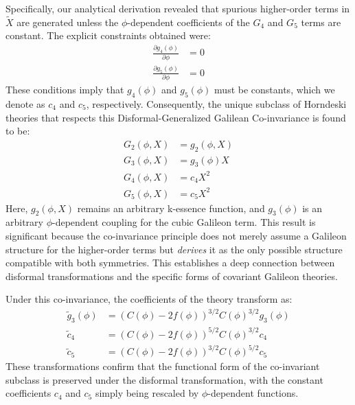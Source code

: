 \documentclass[twocolumn]{aastex631}
\begin{document}
Specifically, our analytical derivation revealed that spurious higher-order terms in $\tilde{X}$ are generated unless the $\phi$-dependent coefficients of the $G_4$ and $G_5$ terms are constant. The explicit constraints obtained were:
\begin{align}
    \frac{\partial g_4(\phi)}{\partial \phi} &= 0 \\
    \frac{\partial g_5(\phi)}{\partial \phi} &= 0
\end{align}
These conditions imply that $g_4(\phi)$ and $g_5(\phi)$ must be constants, which we denote as $c_4$ and $c_5$, respectively. Consequently, the unique subclass of Horndeski theories that respects this Disformal-Generalized Galilean Co-invariance is found to be:
\begin{align}
    G_2(\phi, X) &= g_2(\phi, X) \\
    G_3(\phi, X) &= g_3(\phi) X \\
    G_4(\phi, X) &= c_4 X^2 \\
    G_5(\phi, X) &= c_5 X^2
\end{align}
Here, $g_2(\phi, X)$ remains an arbitrary k-essence function, and $g_3(\phi)$ is an arbitrary $\phi$-dependent coupling for the cubic Galileon term. This result is significant because the co-invariance principle does not merely assume a Galileon structure for the higher-order terms but \textit{derives} it as the only possible structure compatible with both symmetries. This establishes a deep connection between disformal transformations and the specific forms of covariant Galileon theories.

Under this co-invariance, the coefficients of the theory transform as:
\begin{align}
    \tilde{g}_3(\phi) &= (C(\phi) - 2f(\phi))^{3/2} C(\phi)^{3/2} g_3(\phi) \\
    \tilde{c}_4 &= (C(\phi) - 2f(\phi))^{5/2} C(\phi)^{3/2} c_4 \\
    \tilde{c}_5 &= (C(\phi) - 2f(\phi))^{3/2} C(\phi)^{5/2} c_5
\end{align}
These transformations confirm that the functional form of the co-invariant subclass is preserved under the disformal transformation, with the constant coefficients $c_4$ and $c_5$ simply being rescaled by $\phi$-dependent functions.
\end{document}
